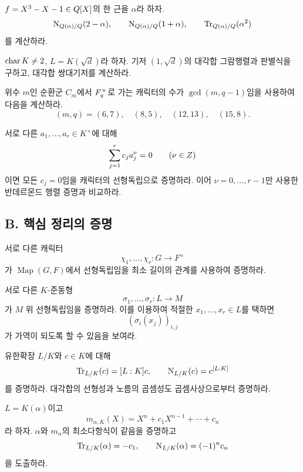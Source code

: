 \begin{exercise}
$f=X^3-X-1\in Q[X]$의 한 근을 $\alpha$라 하자.
\[
  \operatorname{N}_{Q(\alpha)/Q}(2-\alpha),\qquad
  \operatorname{N}_{Q(\alpha)/Q}(1+\alpha),\qquad
  \operatorname{Tr}_{Q(\alpha)/Q}(\alpha^2)
\]
를 계산하라.
\end{exercise}

\begin{exercise}[*]
$\operatorname{char} K\ne2$, $L=K(\sqrt d)$라 하자.
기저 $(1,\sqrt d)$의 대각합 그람행렬과 판별식을 구하고,
대각합 쌍대기저를 계산하라.
\end{exercise}

\begin{exercise}
위수 $m$인 순환군 $C_m$에서 $F_q^\times$로 가는 캐릭터의 수가
$\gcd(m,q-1)$임을 사용하여 다음을 계산하라.
\[
  (m,q)=(6,7),\quad(8,5),\quad(12,13),\quad(15,8).
\]
\end{exercise}

\begin{exercise}
서로 다른 $a_1,\dots,a_r\in K^\times$에 대해
\[
  \sum_{j=1}^r c_j a_j^\nu=0
  \qquad(\nu\in Z)
\]
이면 모든 $c_j=0$임을 캐릭터의 선형독립으로 증명하라.
이어 $\nu=0,\dots,r-1$만 사용한 반데르몬드 행렬 증명과 비교하라.
\end{exercise}

\subsection*{B. 핵심 정리의 증명}

\begin{exercise}[*]
서로 다른 캐릭터
\[
  \chi_1,\dots,\chi_r:G\to F^\times
\]
가 $\operatorname{Map}(G,F)$에서 선형독립임을 최소 길이의 관계를 사용하여 증명하라.
\end{exercise}

\begin{exercise}
서로 다른 $K$-준동형
\[
  \sigma_1,\dots,\sigma_r:L\to M
\]
가 $M$ 위 선형독립임을 증명하라. 이를 이용하여 적절한
$x_1,\dots,x_r\in L$를 택하면
\[
  (\sigma_i(x_j))_{i,j}
\]
가 가역이 되도록 할 수 있음을 보여라.
\end{exercise}

\begin{exercise}
유한확장 $L/K$와 $c\in K$에 대해
\[
  \operatorname{Tr}_{L/K}(c)=[L:K]c,
  \qquad
  \operatorname{N}_{L/K}(c)=c^{[L:K]}
\]
를 증명하라. 대각합의 선형성과 노름의 곱셈성도 곱셈사상으로부터 증명하라.
\end{exercise}

\begin{exercise}[*]
$L=K(\alpha)$이고
\[
  m_{\alpha,K}(X)=X^n+c_1X^{n-1}+\cdots+c_n
\]
라 하자. $\alpha$와 $m_\alpha$의 최소다항식이 같음을 증명하고
\[
  \operatorname{Tr}_{L/K}(\alpha)=-c_1,\qquad
  \operatorname{N}_{L/K}(\alpha)=(-1)^nc_n
\]
을 도출하라.
\end{exercise}

